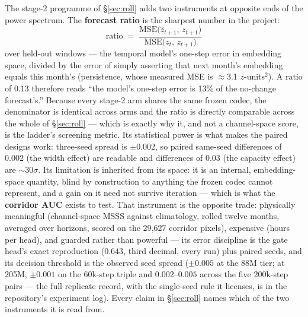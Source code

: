 \documentclass[10pt]{article}
\begin{document}
The stage-2 programme of \S\ref{sec:roll} adds two instruments at
opposite ends of the power spectrum. The \textbf{forecast ratio} is the
sharpest number in the project:
\[
  \mathrm{ratio}
  \;=\;
  \frac{\mathrm{MSE}\bigl(\hat z_{t+1},\,z_{t+1}\bigr)}
       {\mathrm{MSE}\bigl(z_{t},\,z_{t+1}\bigr)}
\]
over held-out windows --- the temporal model's one-step error in
embedding space, divided by the error of simply asserting that next
month's embedding equals this month's (persistence, whose measured MSE
is $\approx$3.1 $z$-units$^2$). A ratio of $0.13$ therefore reads
``the model's one-step error is 13\% of the no-change forecast's.''
Because every stage-2 arm shares the same frozen codec, the denominator
is identical across arms and the ratio is directly comparable across
the whole of \S\ref{sec:roll} --- which is exactly why it, and not a
channel-space score, is the ladder's screening metric. Its
statistical power is what makes the paired designs work: three-seed
spread is $\pm0.002$, so paired same-seed differences of $0.002$
(the width effect) are readable and differences of $0.03$ (the
capacity effect) are $\sim$30$\sigma$. Its limitation is inherited
from its space: it is an internal, embedding-space quantity, blind by
construction to anything the frozen codec cannot represent, and a
gain on it need not survive iteration --- which is what the
\textbf{corridor AUC} exists to test. That instrument is the
opposite trade: physically meaningful (channel-space MSSS against
climatology, rolled twelve months, averaged over horizons, scored on
the 29{,}627 corridor pixels), expensive (hours per head), and
guarded rather than powerful --- its error discipline is the gate
head's exact reproduction ($0.643$, third decimal, every run) plus
paired seeds, and its decision threshold is the observed seed spread
($\pm0.005$ at the 88M tier; at 205M, $\pm0.001$ on the 60k-step triple
and $0.002$--$0.005$ across the five 200k-step pairs --- the full
replicate record, with the single-seed rule it licenses, is in the
repository's experiment log). Every claim in
\S\ref{sec:roll} names which of the two instruments it is read from.
\end{document}
